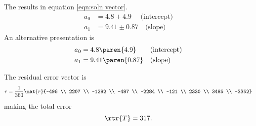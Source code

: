 The results in equation \eqref{eqn:soln vector}.
  \begin{equation}
    \begin{split}
      a_{0} &= 4.8 \pm 4.9 \quad \text{\ \ \ (intercept)} \\
      a_{1} &= 9.41 \pm 0.87 \quad \text{(slope)}
    \end{split}
    \label{eqn:soln vector}
  \end{equation}
An alternative presentation is
  \begin{equation}
    \begin{split}
      a_{0} &= 4.8 \paren{4.9} \quad \text{\ \ \ (intercept)} \\
      a_{1} &= 9.41 \paren{0.87} \quad \text{(slope)}
    \end{split}
  \end{equation}

The residual error vector is
  \begin{equation}
      r = \frac{1}{360}
          \mat{r}{-496 \\ 2207 \\ -1282 \\ -487 \\ -2284 \\ -121 \\ 2330 \\ 3485 \\ -3352}
  \end{equation}
making the total error
  \begin{equation}
      \rtr{T} = 317.
  \end{equation}

\endinput